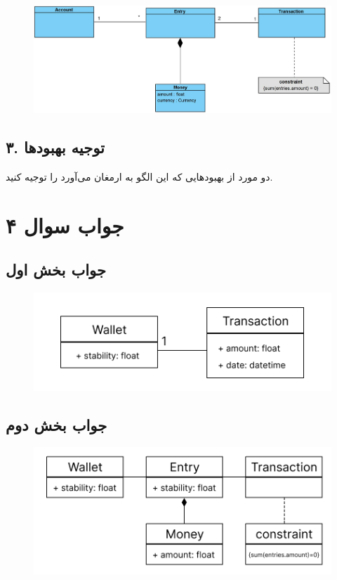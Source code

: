 \begin{figure}[h]
	\centering
	\includegraphics{pic2.jpg}
	\label{fig:label4}
\end{figure}

\subsection*{۳. توجیه بهبود‌ها}
دو مورد از بهبود‌هایی که این الگو به ارمغان می‌آورد را توجیه کنید.

\section*{جواب سوال ۴}

\subsection*{جواب بخش اول}

\begin{figure}[H]
	\centering
	\includegraphics{pic3.png}
	\label{fig:label4}
\end{figure}

\subsection*{جواب بخش دوم}

\begin{figure}[H]
	\centering
	\includegraphics{pic4.png}
	\label{fig:label4}
\end{figure}

